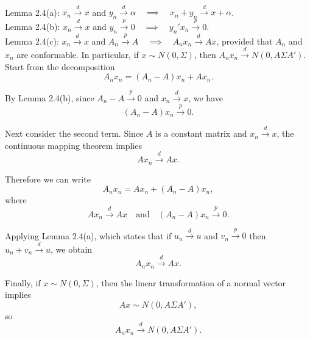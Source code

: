\documentclass[12pt, letterpaper, onecolumn]{exam}
\begin{document}
\begin{solution}
    \\
    Lemma 2.4(a): $x_{n}\xrightarrow{d}x$ and $y_{n}\xrightarrow{d}\alpha \quad
        \implies \quad x_{n}+y_{n}\xrightarrow{d}x+ \alpha$.\\
    Lemma 2.4(b): $x_{n}\xrightarrow{d}x$ and $y_{n}\xrightarrow{p}0 \quad \implies
        \quad y_{n}'x_{n}\xrightarrow{p}0$.\\
    Lemma 2.4(c): $x_{n}\xrightarrow{d}x$ and $A_{n}\xrightarrow{p}A \quad \implies
        \quad A_{n}x_{n}\xrightarrow{d}Ax$, provided that $A_{n}$ and $x_{n}$
    are conformable. In particular, if $x \sim N(0,\Sigma )$, then $A_{n}x_{n}
        \xrightarrow{d}N(0, A \Sigma A')$.\\
    Start from the decomposition
    \[
        A_{n}x_{n}= (A_{n}- A)x_{n}+ A x_{n}.
    \]

    By Lemma 2.4(b), since $A_{n}- A \xrightarrow{p}0$ and
    $x_{n}\xrightarrow{d}x$, we have
    \[
        (A_{n}- A)x_{n}\xrightarrow{p}0 .
    \]

    Next consider the second term. Since $A$ is a constant matrix and $x_{n}\xrightarrow
        {d}x$, the continuous mapping theorem implies
    \[
        A x_{n}\xrightarrow{d}Ax .
    \]

    Therefore we can write
    \[
        A_{n}x_{n}= A x_{n}+ (A_{n}- A)x_{n},
    \]
    where
    \[
        A x_{n}\xrightarrow{d}Ax \quad\text{and}\quad (A_{n}- A)x_{n}\xrightarrow
        {p}0 .
    \]

    Applying Lemma 2.4(a), which states that if $u_{n}\xrightarrow{d}u$ and
    $v_{n}\xrightarrow{p}0$ then $u_{n}+v_{n}\xrightarrow{d}u$, we obtain
    \[
        A_{n}x_{n}\xrightarrow{d}Ax .
    \]

    Finally, if $x \sim N(0,\Sigma)$, then the linear transformation of a
    normal vector implies
    \[
        Ax \sim N(0, A\Sigma A'),
    \]
    so
    \[
        A_{n}x_{n}\xrightarrow{d}N(0, A\Sigma A').
    \]
\end{solution}
\end{document}
